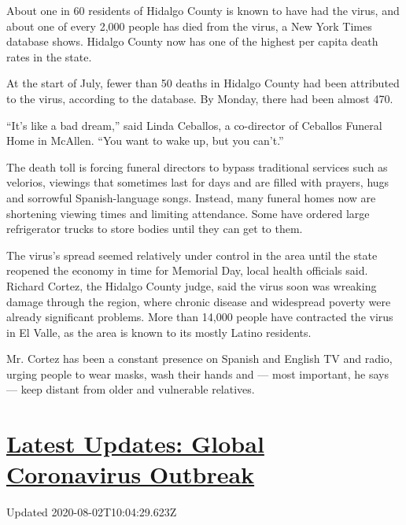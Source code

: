About one in 60 residents of Hidalgo County is known to have had the
virus, and about one of every 2,000 people has died from the virus, a
New York Times database shows. Hidalgo County now has one of the highest
per capita death rates in the state.

At the start of July, fewer than 50 deaths in Hidalgo County had been
attributed to the virus, according to the database. By Monday, there had
been almost 470.

``It's like a bad dream,'' said Linda Ceballos, a co-director of
Ceballos Funeral Home in McAllen. ``You want to wake up, but you
can't.''

The death toll is forcing funeral directors to bypass traditional
services such as velorios, viewings that sometimes last for days and are
filled with prayers, hugs and sorrowful Spanish-language songs. Instead,
many funeral homes now are shortening viewing times and limiting
attendance. Some have ordered large refrigerator trucks to store bodies
until they can get to them.

The virus's spread seemed relatively under control in the area until the
state reopened the economy in time for Memorial Day, local health
officials said. Richard Cortez, the Hidalgo County judge, said the virus
soon was wreaking damage through the region, where chronic disease and
widespread poverty were already significant problems. More than 14,000
people have contracted the virus in El Valle, as the area is known to
its mostly Latino residents.

Mr. Cortez has been a constant presence on Spanish and English TV and
radio, urging people to wear masks, wash their hands and --- most
important, he says --- keep distant from older and vulnerable relatives.

\hypertarget{latest-updates-global-coronavirus-outbreak}{%
\section{\texorpdfstring{\href{https://www.nytimes.com/2020/08/01/world/coronavirus-covid-19.html?action=click\&pgtype=Article\&state=default\&region=MAIN_CONTENT_1\&context=storylines_live_updates}{Latest
Updates: Global Coronavirus
Outbreak}}{Latest Updates: Global Coronavirus Outbreak}}\label{latest-updates-global-coronavirus-outbreak}}

Updated 2020-08-02T10:04:29.623Z

